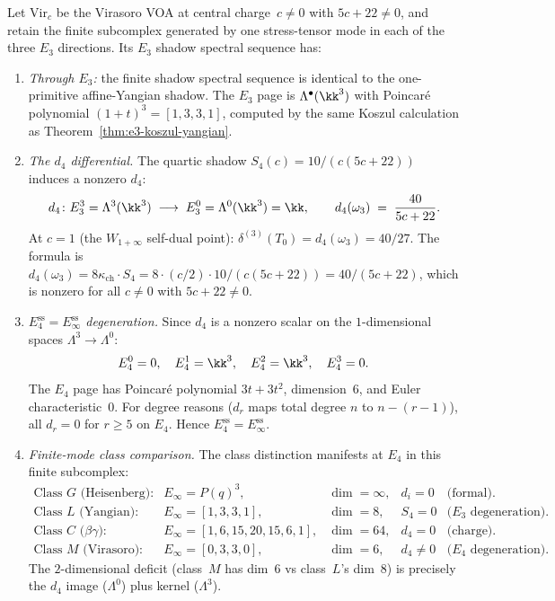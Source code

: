 \begin{proposition}[The finite-mode \texorpdfstring{$d_4$}{d-4} differential for class~\texorpdfstring{$M$}{M}: \texorpdfstring{$\delta^{(3)}(T_0) = 40/27$}{delta-(3)(T-0) = 40/27}]
\label{prop:virasoro-d4}
Let $\mathrm{Vir}_c$ be the Virasoro VOA at central charge~$c \neq 0$ with $5c + 22 \neq 0$, and retain the finite subcomplex generated by one stress-tensor mode in each of the three \(E_3\) directions. Its $E_3$ shadow spectral sequence has:
\begin{enumerate}[label=\textup{(\roman*)}]
 \item \emph{Through $E_3$:} the finite shadow spectral sequence is identical to the one-primitive affine-Yangian shadow. The $E_3$ page is $\Lambda^\bullet(\kk^3)$ with Poincar\'{e} polynomial $(1+t)^3 = [1, 3, 3, 1]$, computed by the same Koszul calculation as Theorem~\ref{thm:e3-koszul-yangian}.

 \item \emph{The $d_4$ differential.} The quartic shadow $S_4(c) = 10/(c(5c + 22))$ induces a nonzero $d_4$:
 \[
 d_4 \colon E_3^3 = \Lambda^3(\kk^3) \;\longrightarrow\; E_3^0 = \Lambda^0(\kk^3) = \kk,
 \qquad
 d_4(\omega_3) \;=\; \frac{40}{5c + 22}.
 \]
 At $c = 1$ (the $W_{1+\infty}$ self-dual point): $\delta^{(3)}(T_0) = d_4(\omega_3) = 40/27$. The formula is $d_4(\omega_3) = 8 \kappa_{\mathrm{ch}} \cdot S_4 = 8 \cdot (c/2) \cdot 10/(c(5c+22)) = 40/(5c+22)$, which is nonzero for all $c \neq 0$ with $5c + 22 \neq 0$.

 \item \emph{$E^{\mathrm{ss}}_4 = E^{\mathrm{ss}}_\infty$ degeneration.} Since $d_4$ is a nonzero scalar on the $1$-dimensional spaces $\Lambda^3 \to \Lambda^0$:
 \[
 E_4^0 = 0, \quad E_4^1 = \kk^3, \quad E_4^2 = \kk^3, \quad E_4^3 = 0.
 \]
 The $E_4$ page has Poincar\'{e} polynomial $3t + 3t^2$, dimension~$6$, and Euler characteristic~$0$. For degree reasons ($d_r$ maps total degree $n$ to $n - (r-1)$), all $d_r = 0$ for $r \geq 5$ on $E_4$. Hence $E^{\mathrm{ss}}_4 = E^{\mathrm{ss}}_\infty$.

 \item \emph{Finite-mode class comparison.} The class distinction manifests at $E_4$ in this finite subcomplex:
 \[
 \begin{array}{lllll}
 \text{Class~$G$ (Heisenberg):} & E_\infty = P(q)^3, & \dim = \infty, & d_i = 0 & \text{(formal)}.\\
 \text{Class~$L$ (Yangian):} & E_\infty = [1,3,3,1], & \dim = 8, & S_4 = 0 & \text{($E_3$ degeneration)}.\\
 \text{Class~$C$ ($\beta\gamma$):} & E_\infty = [1,6,15,20,15,6,1], & \dim = 64, & d_4 = 0 & \text{(charge)}.\\
 \text{Class~$M$ (Virasoro):} & E_\infty = [0,3,3,0], & \dim = 6, & d_4 \neq 0 & \text{($E_4$ degeneration)}.
 \end{array}
 \]
 The $2$-dimensional deficit (class~$M$ has dim~$6$ vs class~$L$'s dim~$8$) is precisely the $d_4$ image ($\Lambda^0$) plus kernel ($\Lambda^3$).
\end{enumerate}
\end{proposition}

